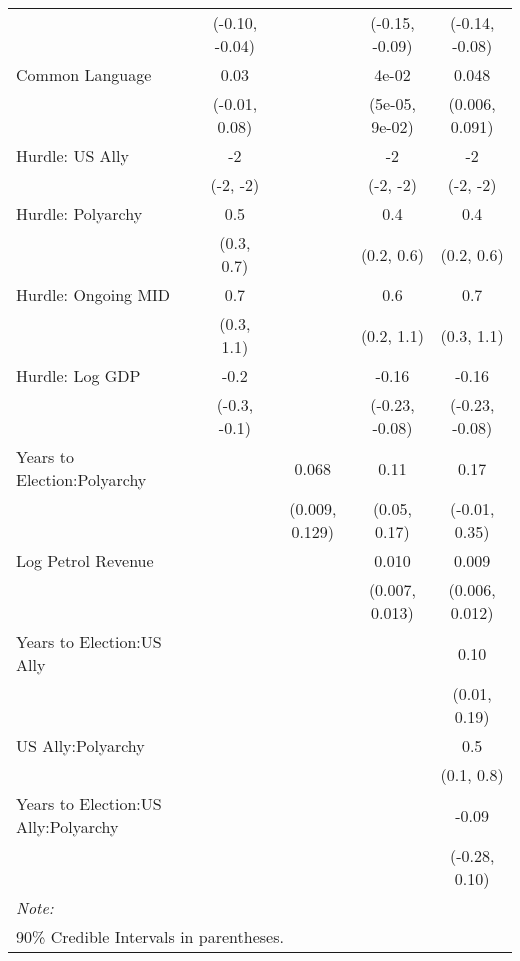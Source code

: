 \begin{table}
{\begin{tabular}[t]{lcccc}
 & (-0.10, -0.04) &  & (-0.15, -0.09) & (-0.14, -0.08)\\
Common Language & 0.03 &  & 4e-02 & 0.048\\
 & (-0.01, 0.08) &  & (5e-05, 9e-02) & (0.006, 0.091)\\
Hurdle: US Ally & -2 &  & -2 & -2\\
 & (-2, -2) &  & (-2, -2) & (-2, -2)\\
Hurdle: Polyarchy & 0.5 &  & 0.4 & 0.4\\
 & (0.3, 0.7) &  & (0.2, 0.6) & (0.2, 0.6)\\
Hurdle: Ongoing MID & 0.7 &  & 0.6 & 0.7\\
 & (0.3, 1.1) &  & (0.2, 1.1) & (0.3, 1.1)\\
Hurdle: Log GDP & -0.2 &  & -0.16 & -0.16\\
 & (-0.3, -0.1) &  & (-0.23, -0.08) & (-0.23, -0.08)\\
Years to Election:Polyarchy &  & 0.068 & 0.11 & 0.17\\
 &  & (0.009, 0.129) & (0.05, 0.17) & (-0.01, 0.35)\\
Log Petrol Revenue &  &  & 0.010 & 0.009\\
 &  &  & (0.007, 0.013) & (0.006, 0.012)\\
Years to Election:US Ally &  &  &  & 0.10\\
 &  &  &  & (0.01, 0.19)\\
US Ally:Polyarchy &  &  &  & 0.5\\
 &  &  &  & (0.1, 0.8)\\
Years to Election:US Ally:Polyarchy &  &  &  & -0.09\\
 &  &  &  & (-0.28, 0.10)\\
\bottomrule
\multicolumn{5}{l}{\rule{0pt}{1em}\textit{Note: }}\\
\multicolumn{5}{l}{\rule{0pt}{1em}90\% Credible Intervals in parentheses.}\\
\end{tabular}}
\end{table}
